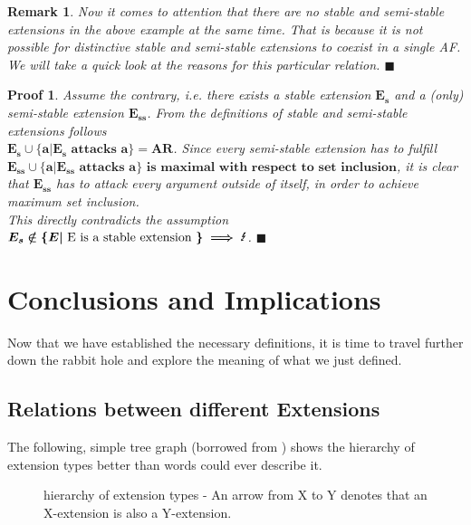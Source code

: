 \documentclass[12pt]{report}
\numberwithin{figure}{chapter}
\theoremstyle{break}
\newtheorem*{prf}{Proof}
\newtheorem*{rmrk}{Remark}
\newenvironment{myprf}{\begin{prf}}{$\blacksquare$ \end{prf}}
\newenvironment{myrmrk}{\begin{rmrk}}{$\blacksquare$ \end{rmrk}}
\begin{document}
\medskip
\begin{myrmrk}
Now it comes to attention that there are no stable and semi-stable extensions in the above example at the same time.
That is because it is not possible for distinctive stable and semi-stable extensions to coexist in a single AF. 
We will take a quick look at the reasons for this particular relation.
\end{myrmrk}
\begin{myprf}
Assume the contrary, i.e. there exists a stable extension $\bm{E_{s}}$ and a (only) semi-stable extension $\bm{E_{ss}}$.
From the definitions of stable and semi-stable extensions follows\\
$\bm{E_{s} \cup \{a \vert E_{s} \text{ attacks } a\} = AR}$. Since every semi-stable extension has to fulfill 
$\bm{E_{ss} \cup \{a \vert E_{ss} \text{ attacks } a\} \textbf{ is maximal with respect to set inclusion}}$,
it is clear that $\bm{E_{ss}}$ has to attack every argument outside of itself, in order to achieve maximum set inclusion.\\
This directly contradicts the assumption $\bm{E_{s} \notin \{E \vert \text{ E is a stable extension }\} \implies \text{\Lightning}}$.
\end{myprf}

\chapter{Conclusions and Implications}

Now that we have established the necessary definitions, it is time to travel further down the rabbit hole and explore the meaning of what we just defined.

\section{Relations between different Extensions}
The following, simple tree graph (borrowed from \cite{Hunter}) shows the hierarchy of extension types better than words could ever describe it.
\begin{figure}[h!]
\begin{center}\end{center}
\caption[hierarchy of extension types]{hierarchy of extension types - 
	An arrow from X to Y denotes that an X-extension is also a Y-extension.}
\label{hierarchy graph}
\end{figure}
\end{document}
